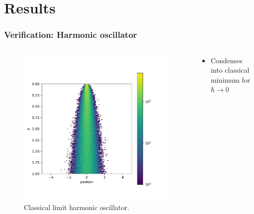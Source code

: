 \documentclass[aspectratio=169]{beamer}
\begin{document}
\section{Results}
\begin{frame}
	\frametitle{Verification: Harmonic oscillator}
	\vspace{-15px}
	\begin{columns}
		\begin{column}{0.49\textwidth}
			\begin{figure}[H]
				\centering
				\includegraphics[width=\textwidth]{../imgs/harmonic_oscillator_classical_limit/harmonic_oscillator_10_classical_limit.pdf}
				\caption{Classical limit harmonic oscillator.}
				\label{fig:harmonic_oscillator_classical_limit}
			\end{figure}
		\end{column}
		\begin{column}{0.49\textwidth}
			\begin{itemize}
				\item Condenses into classical minimum for $\hbar \rightarrow 0$
			\end{itemize}
		\end{column}
	\end{columns}
\end{frame}
\end{document}
